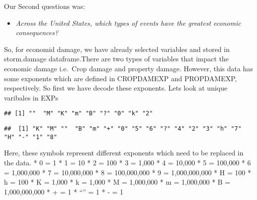 \documentclass[]{article}
\newenvironment{Shaded}{\begin{snugshade}}{\end{snugshade}}
\newcommand{\KeywordTok}[1]{\textcolor[rgb]{0.13,0.29,0.53}{\textbf{#1}}}
\newcommand{\OperatorTok}[1]{\textcolor[rgb]{0.81,0.36,0.00}{\textbf{#1}}}
\newcommand{\NormalTok}[1]{#1}
\providecommand{\tightlist}{%
  \setlength{\itemsep}{0pt}\setlength{\parskip}{0pt}}
\begin{document}
Our Second questions was:

\begin{itemize}
\tightlist
\item
  \emph{Across the United States, which types of events have the
  greatest economic consequences?}
\end{itemize}

So, for economid damage, we have already selected variables and stored
in storm.damage dataframe.There are two types of variables that impact
the economic damage i.e.~Crop damage and property damage. However, this
data has some exponents which are defined in CROPDAMEXP and PROPDAMEXP,
respectively. So first we have decode these exponents. Lets look at
unique varibales in EXPs

\begin{Shaded}
\end{Shaded}

\begin{verbatim}
## [1] ""  "M" "K" "m" "B" "?" "0" "k" "2"
\end{verbatim}

\begin{Shaded}
\end{Shaded}

\begin{verbatim}
##  [1] "K" "M" ""  "B" "m" "+" "0" "5" "6" "?" "4" "2" "3" "h" "7" "H" "-" "1" "8"
\end{verbatim}

Here, these symbols represent different exponents which need to be
replaced in the data. * 0 = 1 * 1 = 10 * 2 = 100 * 3 = 1,000 * 4 =
10,000 * 5 = 100,000 * 6 = 1,000,000 * 7 = 10,000,000 * 8 = 100,000,000
* 9 = 1,000,000,000 * H = 100 * h = 100 * K = 1,000 * k = 1,000 * M =
1,000,000 * m = 1,000,000 * B = 1,000,000,000 * + = 1 * ``'' = 1 * - = 1
\end{document}
